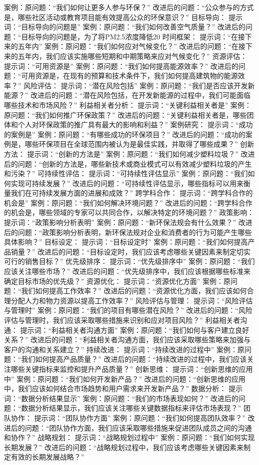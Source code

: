 \documentclass[12pt]{book}
\begin{document}
案例：原问题：“我们如何让更多人参与环保？” 改进后的问题：“公众参与的方式是，哪些社区活动或教育项目能有效提高公众的环保意识？”
目标导向：
提示词：“目标导向的问题是”
案例：原问题：“我们如何改善空气质量？” 改进后的问题：“目标导向的问题是，为了将PM2.5浓度降低20%
时间框架：
提示词：“在接下来的五年内”
案例：原问题：“我们如何应对气候变化？” 改进后的问题：“在接下来的五年内，我们应该实施哪些短期和中期策略来应对气候变化？”
资源评估：
提示词：“可用资源是”
案例：原问题：“我们如何提高能源效率？” 改进后的问题：“可用资源是，在现有的预算和技术条件下，我们如何提高建筑物的能源效率？”
风险评估：
提示词：“潜在风险包括”
案例：原问题：“我们是否应该开发新能源？” 改进后的问题：“潜在风险包括，在开发新能源的过程中，我们可能面临哪些技术和市场风险？”
利益相关者分析：
提示词：“关键利益相关者是”
案例：原问题：“我们如何推广环保政策？” 改进后的问题：“关键利益相关者是，哪些团体和个人对环保政策的推广具有最大的影响和利益？”
案例研究：
提示词：“成功的案例是”
案例：原问题：“有哪些成功的环保项目？” 改进后的问题：“成功的案例是，哪些环保项目在全球范围内被认为是最佳实践，并取得了哪些成果？”
创新方法：
提示词：“创新的方法是”
案例：原问题：“我们如何减少塑料垃圾？” 改进后的问题：“创新的方法是，哪些新技术或商业模式可以有效减少塑料垃圾的产生和污染？”
可持续性评估：
提示词：“可持续性评估显示”
案例：原问题：“我们如何实现可持续发展？” 改进后的问题：“可持续性评估显示，哪些指标可以用来衡量我们在可持续发展方面的进展和成效？”
跨学科合作：
提示词：“跨学科合作的机会是”
案例：原问题：“我们如何解决环境问题？” 改进后的问题：“跨学科合作的机会是，哪些领域的专家可以共同合作，以解决特定的环境问题？”
政策影响：
提示词：“政策影响分析表明”
案例：原问题：“新环保法规会有什么效果？” 改进后的问题：“政策影响分析表明，新环保法规对企业和消费者的行为可能产生哪些具体影响？”
目标设定：
提示词：“目标设定时”
案例：原问题：“我们如何提高产品销量？” 改进后的问题：“目标设定时，我们应该考虑哪些关键因素来制定切实可行的销售目标？”
优先级排序：
提示词：“优先级排序中”
案例：原问题：“我们应该关注哪些市场？” 改进后的问题：“优先级排序中，我们应该根据哪些标准来确定目标市场的优先级？”
资源优化：
提示词：“资源优化方面”
案例：原问题：“我们如何提高工作效率？” 改进后的问题：“资源优化方面，我们应该如何合理分配人力和物力资源以提高工作效率？”
风险评估与管理：
提示词：“风险评估与管理时”
案例：原问题：“我们的项目有哪些潜在风险？” 改进后的问题：“风险评估与管理时，我们应该采取哪些措施来识别和应对项目风险？”
利益相关者沟通：
提示词：“利益相关者沟通方面”
案例：原问题：“我们如何与客户建立良好关系？” 改进后的问题：“利益相关者沟通方面，我们应该采取哪些策略来加强与客户的沟通和关系建立？”
持续改进：
提示词：“持续改进的过程中”
案例：原问题：“我们如何提高产品质量？” 改进后的问题：“持续改进的过程中，我们应该关注哪些关键指标来监控和提升产品质量？”
创新思维：
提示词：“创新思维的应用中”
案例：原问题：“我们如何开发新产品？” 改进后的问题：“创新思维的应用中，我们应该如何结合市场趋势和用户需求来开发新产品？”
数据分析：
提示词：“数据分析结果显示”
案例：原问题：“我们的市场表现如何？” 改进后的问题：“数据分析结果显示，我们应该关注哪些关键数据指标来评估市场表现？”
团队协作：
提示词：“团队协作方面”
案例：原问题：“我们如何提高团队效率？” 改进后的问题：“团队协作方面，我们应该采取哪些措施来促进团队成员之间的沟通和协作？”
战略规划：
提示词：“战略规划过程中”
案例：原问题：“我们如何实现长期发展？” 改进后的问题：“战略规划过程中，我们应该考虑哪些关键因素来制定有效的长期发展战略？”
\end{document}
